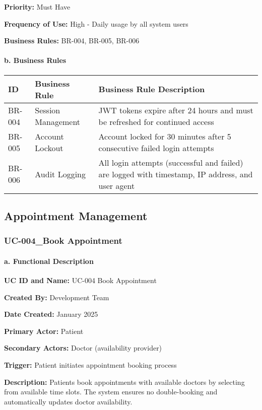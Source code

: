 \documentclass[12pt,a4paper]{article}
\begin{document}
\textbf{Priority:} Must Have

\textbf{Frequency of Use:} High - Daily usage by all system users

\textbf{Business Rules:} BR-004, BR-005, BR-006

\paragraph{b. Business Rules}

\begin{longtable}{|p{2cm}|p{4cm}|p{8cm}|}
\hline
\textbf{ID} & \textbf{Business Rule} & \textbf{Business Rule Description} \\
\hline
BR-004 & Session Management & JWT tokens expire after 24 hours and must be refreshed for continued access \\
\hline
BR-005 & Account Lockout & Account locked for 30 minutes after 5 consecutive failed login attempts \\
\hline
BR-006 & Audit Logging & All login attempts (successful and failed) are logged with timestamp, IP address, and user agent \\
\hline
\end{longtable}

\subsection{Appointment Management}

\subsubsection{UC-004\_Book Appointment}

\paragraph{a. Functional Description}

\textbf{UC ID and Name:} UC-004 Book Appointment

\textbf{Created By:} Development Team

\textbf{Date Created:} January 2025

\textbf{Primary Actor:} Patient

\textbf{Secondary Actors:} Doctor (availability provider)

\textbf{Trigger:} Patient initiates appointment booking process

\textbf{Description:} Patients book appointments with available doctors by selecting from available time slots. The system ensures no double-booking and automatically updates doctor availability.
\end{document}
